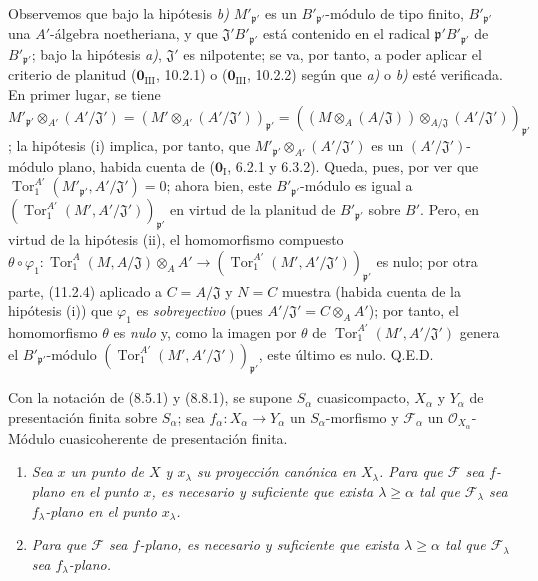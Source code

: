 Observemos que bajo la hipótesis \emph{b)} $M'_{\mathfrak p'}$ es un
$B'_{\mathfrak p'}$-módulo de tipo finito, $B'_{\mathfrak p'}$ una
$A'$-álgebra noetheriana, y que $\mathfrak J'B'_{\mathfrak p'}$ está
contenido en el radical $\mathfrak p'B'_{\mathfrak p'}$ de
$B'_{\mathfrak p'}$; bajo la hipótesis \emph{a)}, $\mathfrak J'$ es nilpotente;
se va, por tanto, a poder aplicar el criterio de planitud
($\mathbf 0_{\mathrm{III}}$, 10.2.1) o ($\mathbf 0_{\mathrm{III}}$, 10.2.2)
según que \emph{a)} o \emph{b)} esté verificada. En primer lugar, se tiene
$M'_{\mathfrak p'}\otimes_{A'}(A'/\mathfrak J')
=(M'\otimes_{A'}(A'/\mathfrak J'))_{\mathfrak p'}
=((M\otimes_A(A/\mathfrak J))\otimes_{A/\mathfrak J}
(A'/\mathfrak J'))_{\mathfrak p'}$;
la hipótesis (i) implica, por tanto, que
$M'_{\mathfrak p'}\otimes_{A'}(A'/\mathfrak J')$ es un
$(A'/\mathfrak J')$-módulo plano, habida cuenta de
($\mathbf 0_{\mathrm I}$, 6.2.1 y 6.3.2). Queda, pues, por ver que
$\operatorname{Tor}_1^{A'}(M'_{\mathfrak p'},A'/\mathfrak J')=0$; ahora bien, este
$B'_{\mathfrak p'}$-módulo es igual a
$(\operatorname{Tor}_1^{A'}(M',A'/\mathfrak J'))_{\mathfrak p'}$ en virtud
de la planitud de $B'_{\mathfrak p'}$ sobre $B'$. Pero, en virtud de
la hipótesis (ii), el homomorfismo compuesto
$\theta\circ\varphi_1:\operatorname{Tor}_1^A(M,A/\mathfrak J)\otimes_AA'
\to(\operatorname{Tor}_1^{A'}(M',A'/\mathfrak J'))_{\mathfrak p'}$ es
nulo; por otra parte, (11.2.4) aplicado a $C=A/\mathfrak J$ y $N=C$ muestra
(habida cuenta de la hipótesis (i)) que $\varphi_1$ es \emph{sobreyectivo} (pues
$A'/\mathfrak J'=C\otimes_AA'$); por tanto, el homomorfismo $\theta$ es
\emph{nulo} y, como la imagen por $\theta$ de
$\operatorname{Tor}_1^{A'}(M',A'/\mathfrak J')$ genera el
$B'_{\mathfrak p'}$-módulo
$(\operatorname{Tor}_1^{A'}(M',A'/\mathfrak J'))_{\mathfrak p'}$, este
último es nulo. Q.E.D.


\begin{theorem}[11.2.6]
\label{IV.11.2.6}
Con la notación de (8.5.1) y (8.8.1), se supone $S_\alpha$ cuasicompacto, $X_\alpha$ y $Y_\alpha$ de presentación finita sobre $S_\alpha$; sea $f_\alpha:X_\alpha\to Y_\alpha$ un $S_\alpha$-morfismo y $\mathcal F_\alpha$ un $\mathcal O_{X_\alpha}$-Módulo cuasicoherente de presentación finita.


\begin{enumerate}[label=\emph{(\roman*)}]
  \item \emph{Sea $x$ un punto de $X$ y $x_\lambda$ su proyección canónica en $X_\lambda$. Para que $\mathcal F$ sea $f$-plano en el punto $x$, es necesario y suficiente que exista $\lambda\geq\alpha$ tal que $\mathcal F_\lambda$ sea $f_\lambda$-plano en el punto $x_\lambda$.}
  \item \emph{Para que $\mathcal F$ sea $f$-plano, es necesario y suficiente que exista $\lambda\geq\alpha$ tal que $\mathcal F_\lambda$ sea $f_\lambda$-plano.}
\end{enumerate}
\end{theorem}

